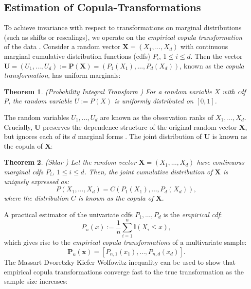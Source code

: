 \documentclass{article}
\newtheorem{theorem}{Theorem}
\begin{document}
\subsection{Estimation of Copula-Transformations}
\label{sec:estim-copula-transf}
To achieve invariance with respect to transformations on marginal distributions
(such as shifts or rescalings), we operate on the \emph{empirical copula
transformation} of the data \cite{Nelsen06,Poczos12}. Consider a random vector
$\bm X = (X_1, \ldots, X_d)$ with continuous marginal cumulative distribution
functions (cdfs) $P_i$, $1 \leq i \leq d$. Then the vector $\bm U =
(U_1,\ldots,U_d) := \bm P(\bm X) = (P_1(X_1),\ldots,P_d(X_d))$, known as the
\emph{copula transformation}, has uniform marginals:
\begin{theorem}
  (Probability Integral Transform \cite{Nelsen06}) For a random variable $X$
  with cdf $P$, the random variable $U := P(X)$ is uniformly distributed on
  $[0,1]$.
\end{theorem}
The random variables $U_1, \ldots, U_d$ are known as the observation ranks of
$X_1, \ldots, X_d$. Crucially, $\bm U$ preserves the dependence structure of
the original random vector $\bm X$, but ignores each of its $d$ marginal forms
\cite{Nelsen06}.  The joint distribution of $\bm U$ is known as the copula of
$\bm X$:
\begin{theorem}
  (Sklar \cite{Sklar59}) Let the random vector $\bm X = (X_1, \ldots, X_d)$
  have continuous marginal cdfs $P_i$, $1 \leq i \leq d$. Then, the joint
  cumulative distribution of $\bm X$ is uniquely expressed as:
\begin{equation}
  P(X_1, \ldots, X_d) = C(P_1(X_1), \ldots, P_d(X_d)),
\end{equation}
where the distribution $C$ is known as the copula of $\bm X$.
\end{theorem}
A practical estimator of the univariate cdfs $P_1, \ldots, P_d$ is the
\emph{empirical cdf}:
\begin{equation}
  P_n(x) := \frac{1}{n} \sum_{i=1}^n \mathbb{I}(X_i \leq x),
\end{equation}
which gives rise to the \emph{empirical copula transformations} of a
multivariate sample:
\begin{equation}
\bm P_n(\bm x) = [{P}_{n,1}(x_1), \ldots, {P}_{n,d}(x_d)].
\end{equation}
The Massart-Dvoretzky-Kiefer-Wolfowitz inequality \cite{Massart90} can be used
to show that empirical copula transformations converge fast to the true
transformation as the sample size increases:
\end{document}
